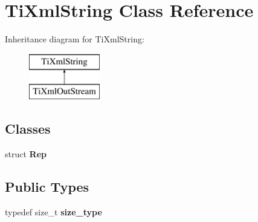\hypertarget{class_ti_xml_string}{
\section{TiXmlString Class Reference}
\label{class_ti_xml_string}
}
Inheritance diagram for TiXmlString:\begin{figure}[H]
\begin{center}
\leavevmode
\includegraphics[height=2.000000cm]{class_ti_xml_string}
\end{center}
\end{figure}
\subsection*{Classes}
\begin{DoxyCompactItemize}
\item 
struct {\bfseries Rep}
\end{DoxyCompactItemize}
\subsection*{Public Types}
\begin{DoxyCompactItemize}
\item 
\hypertarget{class_ti_xml_string_abeb2c1893a04c17904f7c06546d0b971}{
typedef size\_\-t {\bfseries size\_\-type}}
\label{class_ti_xml_string_abeb2c1893a04c17904f7c06546d0b971}

\end{DoxyCompactItemize}
